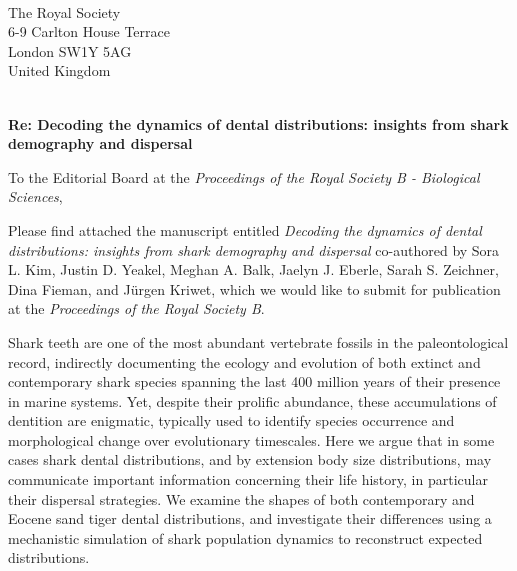 \documentclass[ucm,12pt]{ucletter}
\begin{document}
\begin{letter}{
  \\The Royal Society\\
   6-9 Carlton House Terrace\\
  London SW1Y 5AG\\
  United Kingdom\\ \\
    \centerline{\bf{Re: Decoding the dynamics of dental distributions: insights from shark demography and dispersal}}
    \vspace{-5mm}
}


\opening{To the Editorial Board at the \emph{Proceedings of the Royal Society B - Biological Sciences},}


Please find attached the manuscript entitled \emph{Decoding the dynamics of dental distributions: insights from shark demography and dispersal} co-authored by Sora L. Kim, Justin D. Yeakel, Meghan A. Balk, Jaelyn J. Eberle, Sarah S. Zeichner, Dina Fieman, and J\"urgen Kriwet, which we would like to submit for publication at the \emph{Proceedings of the Royal Society B}. 

Shark teeth are one of the most abundant vertebrate fossils in the paleontological record, indirectly documenting the ecology and evolution of both extinct and contemporary shark species spanning the last 400 million years of their presence in marine systems.
Yet, despite their prolific abundance, these accumulations of dentition are enigmatic, typically used to identify species occurrence and morphological change over evolutionary timescales.
Here we argue that in some cases shark dental distributions, and by extension body size distributions, may communicate important information concerning their life history, in particular their dispersal strategies.
We examine the shapes of both contemporary and Eocene sand tiger dental distributions, and investigate their differences using a mechanistic simulation of shark population dynamics to reconstruct expected distributions.



\end{letter}
\end{document}
